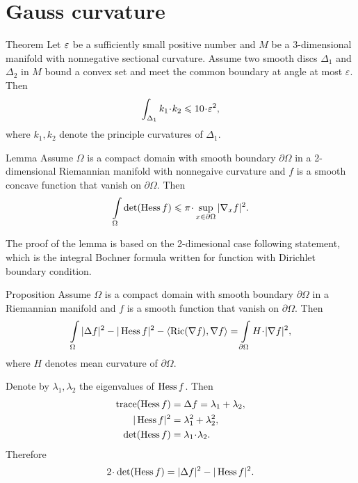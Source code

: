 \section{Gauss curvature}
\label{sec:gauss}

\begin{thm}{Theorem}\label{thm:lens}
Let $\varepsilon$ be a sufficiently small positive number and 
$M$ be a 3-dimensional manifold with nonnegative sectional curvature.
Assume two smooth discs $\Delta_1$ and $\Delta_2$ in $M$ bound a convex set and meet the common boundary at angle at most $\varepsilon$.
Then 
\[\int_{\Delta_1}k_1\cdot k_2\le 10\cdot \eps^2,\]
where $k_1,k_2$ denote the principle curvatures of $\Delta_1$.
\end{thm}

\begin{thm}{Lemma}\label{lem:bochner}
Assume $\Omega$ is a compact domain with smooth boundary $\partial \Omega$ in a 2-dimensional Riemannian manifold with nonnegaive curvature
and $f$ is a smooth concave function that vanish on $\partial \Omega$.
Then
\[\int\limits_\Omega 
\det(\Hess f)
\le\pi\cdot\sup_{x\in\partial\Omega}|\nabla_x f|^2.\]

\end{thm}

The proof of the lemma is based on the 2-dimesional case  following statement,
which is the integral Bochner formula written for function with Dirichlet boundary condition.

\begin{thm}{Proposition}\label{prop:bochner-dirichle}
Assume $\Omega$ is a compact domain with smooth boundary $\partial \Omega$ in a Riemannian manifold
and $f$ is a smooth function that vanish on $\partial \Omega$.
Then
\[\int\limits_\Omega |\Delta f|^2
-|\Hess f|^2
-\langle\mathrm{Ric}(\nabla f),\nabla f\rangle
=\int\limits_{\partial\Omega}
H\cdot|\nabla f|^2,\]
where $H$ denotes mean curvature of $\partial \Omega$.
\end{thm}

Denote by  $\lambda_1,\lambda_2$ the eigenvalues of  $\operatorname{Hess} f$.
Then
\begin{align*}
\trace(\Hess f)&=\Delta f=\lambda_1+\lambda_2,
\\
|\Hess f|^2&=\lambda_1^2+\lambda_2^2,
\\
\det(\Hess f)&=\lambda_1\cdot\lambda_2.
\end{align*}
Therefore 
\[2\cdot\det(\Hess f)
=|\Delta f|^2
-|\Hess f|^2.\] 

